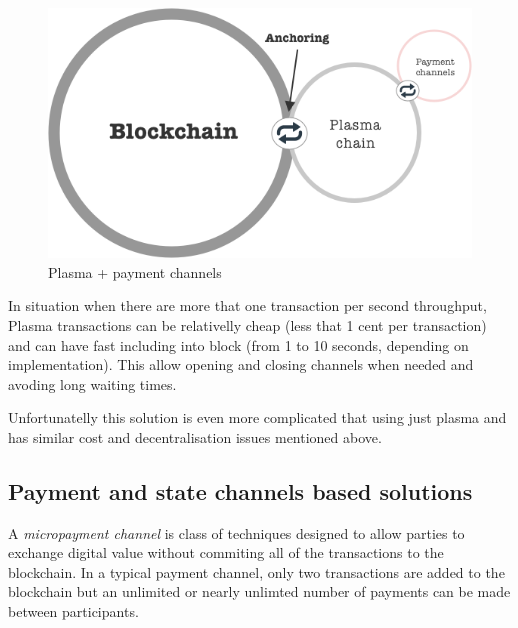\documentclass[a4paper,12pt]{article}
\begin{document}
\begin{figure}[H]
    \centering
    \includegraphics[scale=0.5]{../img/plasma-channels}
    \caption{Plasma + payment channels}
    \label{img:plasma-channels}
\end{figure}

In situation when there are more that one transaction per second throughput, 
Plasma transactions can be relativelly cheap (less that 1 cent per transaction)
and can have fast including into block (from 1 to 10 seconds, depending on 
implementation). This allow opening and closing channels when needed and avoding
long waiting times.

Unfortunatelly this solution is even more complicated that using just plasma and
has similar cost and decentralisation issues mentioned above.

\subsection{Payment and state channels based solutions}

A \textit{micropayment channel} is class of techniques designed to allow parties
to exchange digital value without commiting all of the transactions to the 
blockchain. In a typical payment channel, only two transactions are added to the 
blockchain but an unlimited or nearly unlimted number of payments can be made 
between participants.
\end{document}
